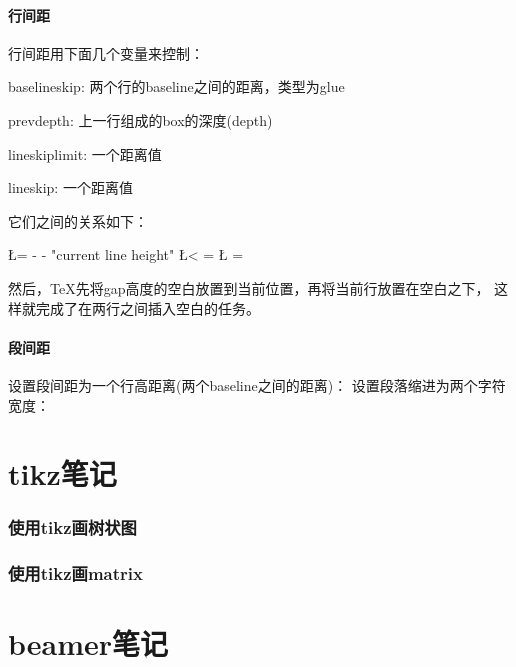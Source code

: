 \documentclass{article}
\begin{document}
  \subsection[行间距]{行间距}
  行间距用下面几个变量来控制：
  \begin{coloredenumerate}
    \item \bs baselineskip: 两个行的baseline之间的距离，类型为glue
    \item \bs prevdepth: 上一行组成的box的深度(depth)
    \item \bs lineskiplimit: 一个距离值
    \item \bs lineskip: 一个距离值
  \end{coloredenumerate}
  它们之间的关系如下：\par
  \begin{latexcode}
    \def\gap{}
    \L = \baselineskip - \prevdepth - "current line height"
    \if \L < \lineskiplimit
      \gap = \L
    \else
      \gap = \lineskip
  \end{latexcode}
  然后，\TeX{}先将\bs gap高度的空白放置到当前位置，再将当前行放置在空白之下，
  这样就完成了在两行之间插入空白的任务。
  \subsection[段间距]{段间距}
  设置段间距为一个行高距离(两个baseline之间的距离)：
  设置段落缩进为两个字符宽度：

  


  \part[tikz笔记]{tikz笔记}

  \section[使用tikz画树状图]{使用tikz画树状图}
  \section[使用tikz画matrix]{使用tikz画matrix}

  \part[beamer笔记]{beamer笔记}

\end{document}
